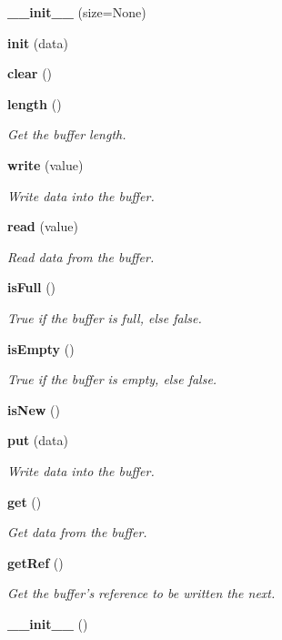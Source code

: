 \begin{CompactItemize}
\item 
{\bf \_\-\_\-init\_\-\_\-} (size=None)
\item 
{\bf init} (data)
\item 
{\bf clear} ()
\item 
{\bf length} ()
\begin{CompactList}\small\item\em Get the buffer length. \item\end{CompactList}\item 
{\bf write} (value)
\begin{CompactList}\small\item\em Write data into the buffer. \item\end{CompactList}\item 
{\bf read} (value)
\begin{CompactList}\small\item\em Read data from the buffer. \item\end{CompactList}\item 
{\bf is\-Full} ()
\begin{CompactList}\small\item\em True if the buffer is full, else false. \item\end{CompactList}\item 
{\bf is\-Empty} ()
\begin{CompactList}\small\item\em True if the buffer is empty, else false. \item\end{CompactList}\item 
{\bf is\-New} ()
\item 
{\bf put} (data)
\begin{CompactList}\small\item\em Write data into the buffer. \item\end{CompactList}\item 
{\bf get} ()
\begin{CompactList}\small\item\em Get data from the buffer. \item\end{CompactList}\item 
{\bf get\-Ref} ()
\begin{CompactList}\small\item\em Get the buffer's reference to be written the next. \item\end{CompactList}\item 
{\bf \_\-\_\-init\_\-\_\-} ()
\end{CompactItemize}



